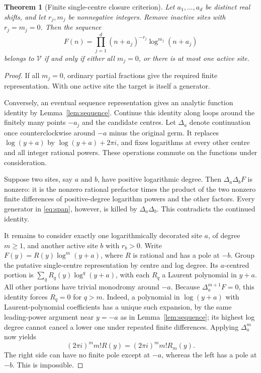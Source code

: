 \documentclass[11pt,a4paper]{article}
\numberwithin{equation}{section}
\newtheorem{theorem}{Theorem}[section]
\theoremstyle{definition}\newtheorem{definition}[theorem]{Definition}
\theoremstyle{remark}\newtheorem{remark}[theorem]{Remark}
\begin{document}
\begin{theorem}[Finite single-centre closure criterion]
\label{thm:classification}
Let $a_1,\ldots,a_d$ be distinct real shifts, and let $r_j,m_j$ be
nonnegative integers. Remove inactive sites with $r_j=m_j=0$.
Then the sequence
\begin{equation}
 F(n)=\prod_{j=1}^d(n+a_j)^{-r_j}\log^{m_j}(n+a_j)
 \label{eq:target}
\end{equation}
belongs to $\mathcal V$ if and only if either all $m_j=0$, or there
is at most one active site.
\end{theorem}
\begin{proof}
If all $m_j=0$, ordinary partial fractions give the required finite
representation. With one active site the target is itself a generator.

Conversely, an eventual sequence representation gives an analytic
function identity by Lemma~\ref{lem:sequence}. Continue this identity
along loops around the finitely many points $-a_j$ and the candidate
centres. Let $\Delta_a$ denote continuation once counterclockwise
around $-a$ minus the original germ. It replaces $\log(y+a)$ by
$\log(y+a)+2\pi i$, and fixes logarithms at every other centre and
all integer rational powers. These operations commute on the functions
under consideration.

Suppose two sites, say $a$ and $b$, have positive logarithmic degree.
Then $\Delta_a\Delta_bF$ is nonzero: it is the nonzero rational
prefactor times the product of the two nonzero finite differences of
positive-degree logarithm powers and the other factors. Every generator
in \eqref{eq:span}, however, is killed by $\Delta_a\Delta_b$. This
contradicts the continued identity.

It remains to consider exactly one logarithmically decorated site $a$,
of degree $m\ge1$, and another active site $b$ with $r_b>0$.
Write $F(y)=R(y)\log^m(y+a)$, where $R$ is rational and has a pole
at $-b$. Group the putative single-centre representation by centre and
log degree. Its $a$-centred portion is
$\sum_qR_q(y)\log^q(y+a)$, with each $R_q$ a Laurent polynomial in
$y+a$. All other portions have trivial monodromy around $-a$.
Because $\Delta_a^{m+1}F=0$, this identity forces $R_q=0$ for $q>m$.
Indeed, a polynomial in $\log(y+a)$ with Laurent-polynomial coefficients
has a unique such expansion, by the same leading-power argument near
$y=-a$ as in Lemma~\ref{lem:sequence}; its highest log degree cannot
cancel a lower one under repeated finite differences.
Applying $\Delta_a^m$ now yields
\[
 (2\pi i)^m m!R(y)=(2\pi i)^m m!R_m(y).
\]
The right side can have no finite pole except at $-a$, whereas the left
has a pole at $-b$. This is impossible.
\end{proof}
\end{document}
